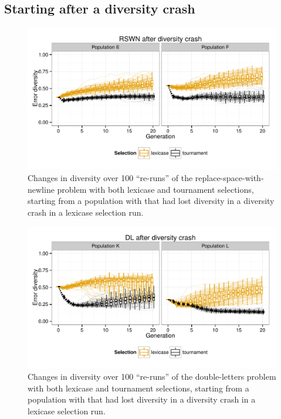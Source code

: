 \documentclass{sig-alternate-05-2015}
\begin{document}
\subsection{Starting after a diversity crash}
\label{sec:crashDiversityResults}

\begin{figure}
	\includegraphics{../figures/RSWN_diversity_crash}
	\vspace{-1 cm}
	\caption{Changes in diversity over 100 ``re-runs'' of the replace-space-with-newline problem with both lexicase and tournament selections, starting from a population with that had lost diversity in a diversity crash in a lexicase selection run.}
	\label{fig:RSWNdiversityCrash}
\end{figure}

\begin{figure}
	\includegraphics{../figures/DL_diversity_crash}
	\vspace{-1 cm}
	\caption{Changes in diversity over 100 ``re-runs'' of the double-letters problem with both lexicase and tournament selections, starting from a population with that had lost diversity in a diversity crash in a lexicase selection run.}
	\label{fig:DLdiversityCrash}
\end{figure}
\end{document}
